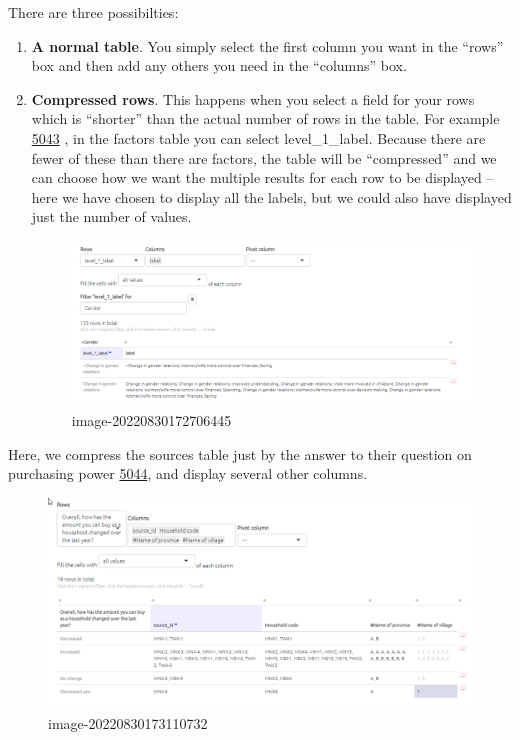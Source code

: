 \documentclass[
]{book}
\begin{document}
There are three possibilties:

\begin{enumerate}
\def\labelenumi{\arabic{enumi}.}
\item
  \textbf{A normal table}. You simply select the first column you want in the ``rows'' box and then add any others you need in the ``columns'' box.
\item
  \textbf{Compressed rows}. This happens when you select a field for your rows which is ``shorter'' than the actual number of rows in the table. For example \href{https://causalmap.shinyapps.io/tokyo/?s=5043}{5043} , in the factors table you can select level\_1\_label. Because there are fewer of these than there are factors, the table will be ``compressed'' and we can choose how we want the multiple results for each row to be displayed -- here we have chosen to display all the labels, but we could also have displayed just the number of values.

  \begin{figure}
  \centering
  \includegraphics{_assets/image-20220830172706445.png}
  \caption{image-20220830172706445}
  \end{figure}
\end{enumerate}

Here, we compress the sources table just by the answer to their question on purchasing power \href{https://causalmap.shinyapps.io/tokyo/?s=5044}{5044}, and display several other columns.

\begin{figure}
\centering
\includegraphics{_assets/image-20220830173110732.png}
\caption{image-20220830173110732}
\end{figure}
\end{document}
